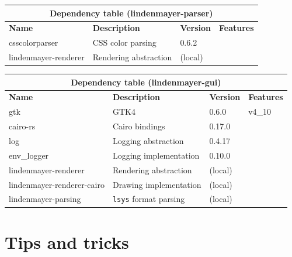 \documentclass[a4paper]{article}
\begin{document}
\bgroup{}
\def\arraystretch{1.5}
\begin{center}
    \begin{tabular}{ |p{2cm}|p{4cm}|p{1.5cm}|p{2cm}| }
        \hline
        \multicolumn{4}{|c|}{\textbf{Dependency table (lindenmayer-parser)}} \\
        \hline
        \textbf{Name} & \textbf{Description} & \textbf{Version} & \textbf{Features} \\
        \hline
        csscolorparser & \gls{CSS} color parsing & 0.6.2 & \- \\
        \hline
        lindenmayer-renderer & Rendering abstraction & (local) & \- \\
        \hline
    \end{tabular}
\end{center}
\egroup{}

\bgroup{}
\def\arraystretch{1.5}
\begin{center}
    \begin{tabular}{ |p{2cm}|p{4cm}|p{1.5cm}|p{2cm}| }
        \hline
        \multicolumn{4}{|c|}{\textbf{Dependency table (lindenmayer-gui)}} \\
        \hline
        \textbf{Name} & \textbf{Description} & \textbf{Version} & \textbf{Features} \\
        \hline
        gtk & GTK4 & 0.6.0 & v4\_10 \\
        \hline
        cairo-rs & Cairo bindings & 0.17.0 & \- \\
        \hline
        log & Logging abstraction & 0.4.17 & \- \\
        \hline
        env\_logger & Logging implementation & 0.10.0 & \- \\
        \hline
        lindenmayer-renderer & Rendering abstraction & (local) & \- \\
        \hline
        lindenmayer-renderer-cairo & Drawing implementation & (local) & \- \\
        \hline
        lindenmayer-parsing & \texttt{lsys} format parsing & (local) & \- \\
        \hline
    \end{tabular}
\end{center}
\egroup{}

\pagebreak

\section{Tips and tricks}
\end{document}
